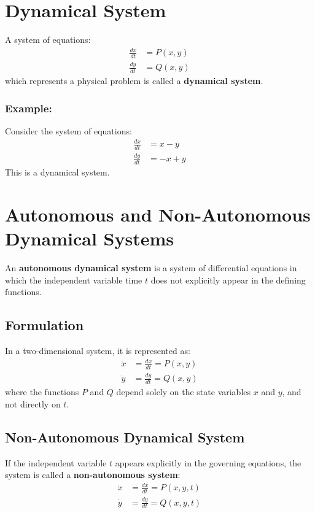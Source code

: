 \section*{Dynamical System}

A system of equations:
\begin{align*}
    \frac{dx}{dt} &= P(x, y) \\
    \frac{dy}{dt} &= Q(x, y)
\end{align*}
which represents a physical problem is called a \textbf{dynamical system}.

\subsubsection*{Example:}
Consider the system of equations:
\begin{align*}
    \frac{dx}{dt} &= x - y \\
    \frac{dy}{dt} &= -x + y
\end{align*}
This is a dynamical system.
\section*{Autonomous and Non-Autonomous Dynamical Systems}

An \textbf{autonomous dynamical system} is a system of differential equations in which the independent variable time $t$ does not explicitly appear in the defining functions.

\subsection*{Formulation}
In a two-dimensional system, it is represented as:
\begin{align*}
    \dot{x} &= \frac{dx}{dt} = P(x, y) \\
    \dot{y} &= \frac{dy}{dt} = Q(x, y)
\end{align*}
where the functions $P$ and $Q$ depend solely on the state variables $x$ and $y$, and not directly on $t$.

\subsection*{Non-Autonomous Dynamical System}
If the independent variable $t$ appears explicitly in the governing equations, the system is called a \textbf{non-autonomous system}:
\begin{align*}
    \dot{x} &= \frac{dx}{dt} = P(x, y, t) \\
    \dot{y} &= \frac{dy}{dt} = Q(x, y, t)
\end{align*}

